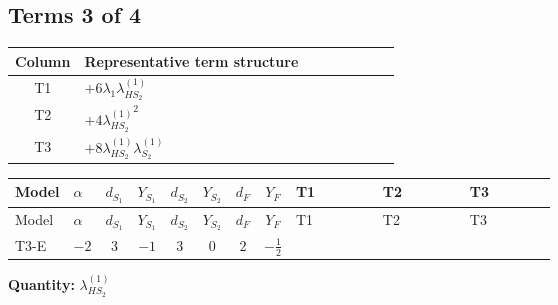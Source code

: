 \documentclass[8pt]{article}
\begin{document}
\begin{landscape}
\subsection*{Terms 3 of 4}
\begin{center}
\begin{tabular}{@{}c >{\raggedright\arraybackslash}p{0.82\linewidth}@{}}
\toprule
Column & Representative term structure \\
\midrule
T1 & \(\displaystyle +6 {\lambda_1} {\lambda_{HS_2}^{(1)}}\) \\
\midrule
T2 & \(\displaystyle +4 {\lambda_{HS_2}^{(1)}}^2\) \\
\midrule
T3 & \(\displaystyle +8 {\lambda_{HS_2}^{(1)}} {\lambda_{S_2}^{(1)}}\) \\
\midrule
\bottomrule
\end{tabular}
\end{center}
\smallskip
\tiny
\begin{longtable}{@{}llcccccc >{\raggedright\arraybackslash}p{0.21\linewidth} >{\raggedright\arraybackslash}p{0.21\linewidth} >{\raggedright\arraybackslash}p{0.21\linewidth}@{}}
\toprule
Model & $\alpha$ & $d_{S_1}$ & $Y_{S_1}$ & $d_{S_2}$ & $Y_{S_2}$ & $d_F$ & $Y_F$ & T1 & T2 & T3 \\
\midrule
\endfirsthead
\toprule
Model & $\alpha$ & $d_{S_1}$ & $Y_{S_1}$ & $d_{S_2}$ & $Y_{S_2}$ & $d_F$ & $Y_F$ & T1 & T2 & T3 \\
\midrule
\endhead
T3-E & $-2$ & $3$ & $-1$ & $3$ & $0$ & $2$ & $-\frac{1}{2}$ & \scriptsize\adjustbox{max width=\linewidth}{$\begin{gathered} +6 {\lambda_1} {\lambda_{HS_2}^{(1)}}\end{gathered}$} & \scriptsize\adjustbox{max width=\linewidth}{$\begin{gathered} +4 {\lambda_{HS_2}^{(1)}}^2\end{gathered}$} & \scriptsize\adjustbox{max width=\linewidth}{$\begin{gathered} +8 {\lambda_{HS_2}^{(1)}} {\lambda_{S_2}^{(1)}}\end{gathered}$} \\
\midrule
\bottomrule
\end{longtable}
\clearpage
\noindent\textbf{Quantity: }$\lambda_{HS_2}^{(1)}$\par\smallskip

\end{landscape}
\end{document}
